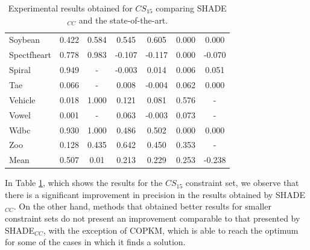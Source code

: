 \documentclass[review]{elsarticle}
\begin{document}
\begin{table}[!h]
{\begin{tabular}{lcccccc}
			Soybean & 0.422 & 0.584 & 0.545 & 0.605 & 0.000 & 0.000 \\
			Spectfheart & 0.778 & 0.983 & -0.107 & -0.117 & 0.000 & -0.070 \\
			Spiral & 0.949 & - & -0.003 & 0.014 & 0.006 & 0.051 \\
			Tae & 0.066 & - & 0.008 & -0.004 & 0.062 & 0.000 \\
			Vehicle & 0.018 & 1.000 & 0.121 & 0.081 & 0.576 & - \\
			Vowel & 0.001 & - & 0.063 & -0.003 & 0.073 & - \\
			Wdbc & 0.930 & 1.000 & 0.486 & 0.502 & 0.000 & 0.000 \\
			Zoo & 0.128 & 0.435 & 0.642 & 0.450 & 0.353 & - \\
			\hline
			Mean  & 0.507 & 0.01 & 0.213 & 0.229 & 0.253 & -0.238 \\
			\hline
		\end{tabular}}
		
	\caption{Experimental results obtained for $CS_{15}$ comparing SHADE$_{CC}$ and the state-of-the-art.}
	\label{tab:results15SOTA}
\end{table}

In Table \ref{tab:results15SOTA}, which shows the results for the $CS_{15}$ constraint set, we observe that there is a significant improvement in precision in the results obtained by SHADE$_{CC}$. On the other hand, methods that obtained better results for smaller constraint sets do not present an improvement comparable to that presented by SHADE$_{CC}$, with the exception of COPKM, which is able to reach the optimum for some of the cases in which it finds a solution.
\end{document}

